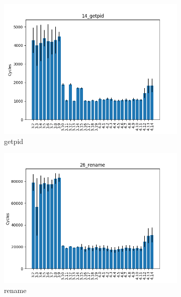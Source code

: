 \documentclass{article}
\begin{document}
\begin{figure}[h!]
    \begin{subfigure}[b]{0.3\textwidth}
        \includegraphics[width=\textwidth]{../report/14_getpid.png}
        \caption{getpid}
    \end{subfigure}
    \begin{subfigure}[b]{0.3\textwidth}
        \includegraphics[width=\textwidth]{../report/26_rename.png}
        \caption{rename}
    \end{subfigure}
    \begin{subfigure}[b]{0.3\textwidth}

\end{subfigure}
\end{figure}
\end{document}
